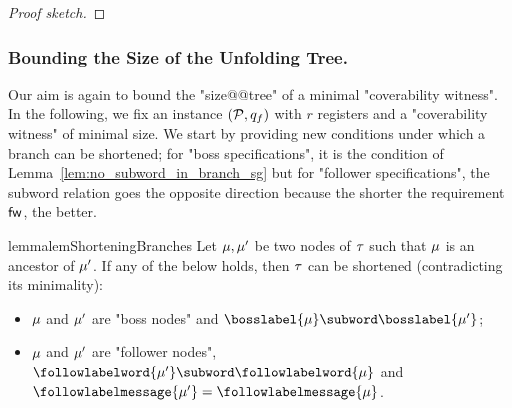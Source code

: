 \begin{proof}[Proof sketch]
\end{proof}





\subsubsection{Bounding the Size of the Unfolding Tree.}
\label{sec:tree-bounds}

Our aim is again to bound the "size@@tree" of a minimal "coverability witness". In the following, we fix an instance $(\mathcal{P},q_f)$ with $r$ registers and a "coverability witness" of minimal size. We start by providing new conditions under which a branch can be shortened; for "boss specifications", it is the condition of Lemma~\ref{lem:no_subword_in_branch_sg} but for "follower specifications", the subword relation goes the opposite direction because the shorter the requirement $\mathsf{fw}$, the better.

\begin{restatable}{lemma}{lemShorteningBranches} 
\label{lem:shortening-branches}
	Let $\mu, \mu'$ be two nodes of $\tau$ such that $\mu$ is an ancestor of $\mu'$. If any of the below holds, then $\tau$ can be shortened  (contradicting its minimality):
	\begin{itemize}
	\item $\mu$ and $\mu'$ are "boss nodes" and $\bosslabel{\node} \subword \bosslabel{\node'}$; 
	\item $\mu$ and $\mu'$ are "follower nodes", $\followlabelword{\node'} \subword \followlabelword{\node}$ and $\followlabelmessage{\node'}=\followlabelmessage{\node}$.
	\end{itemize} 
\end{restatable}

